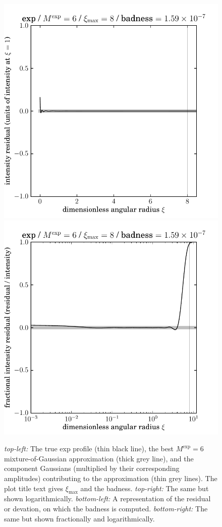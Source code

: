 \documentclass[12pt,pdftex,preprint]{aastex}
\newlength{\figurewidth}
\begin{document}
\begin{figure}
\includegraphics[width=\figurewidth]{exp_K06_MR08_residual.pdf}%
\includegraphics[width=\figurewidth]{exp_K06_MR08_fractional_log.pdf}
\caption{\textsl{top-left:} The true exp profile (thin black line),
  the best $M^{\exp}=6$ mixture-of-Gaussian approximation (thick grey
  line), and the component Gaussians (multiplied by their
  corresponding amplitudes) contributing to the approximation (thin
  grey lines).  The plot title text gives $\xi_{\max}$ and the
  badness. \textsl{top-right:} The same but shown logarithmically.
  \textsl{bottom-left:} A representation of the residual or devation,
  on which the badness is computed.  \textsl{bottom-right:} The same
  but shown fractionally and logarithmically.\label{fig:exp}}
\end{figure}
\end{document}
